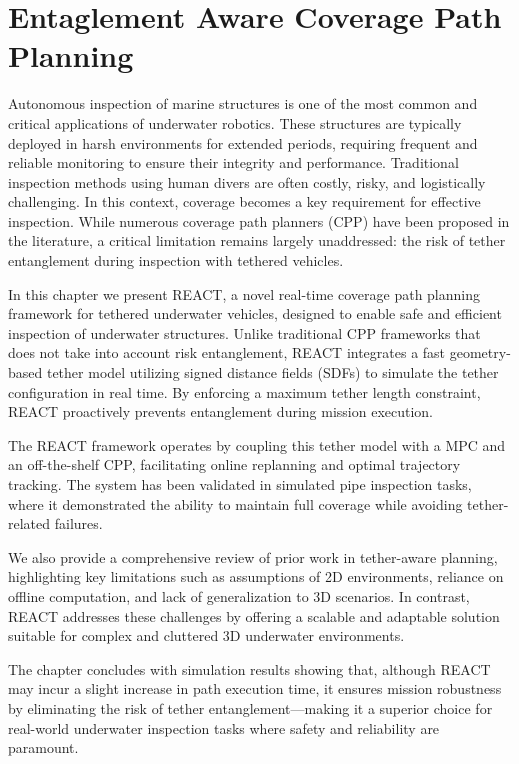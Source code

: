 \chapter{Entaglement Aware Coverage Path Planning}

Autonomous inspection of marine structures is one of the most common and critical applications of underwater robotics. These structures are typically deployed in harsh environments for extended periods, requiring frequent and reliable monitoring to ensure their integrity and performance. Traditional inspection methods using human divers are often costly, risky, and logistically challenging. In this context, coverage becomes a key requirement for effective inspection. While numerous coverage path planners (CPP) have been proposed in the literature, a critical limitation remains largely unaddressed: the risk of tether entanglement during inspection with tethered vehicles.
 
 In this chapter we present REACT, a novel real-time coverage path planning framework for tethered underwater vehicles, designed to enable safe and efficient inspection of underwater structures. Unlike traditional CPP frameworks that does not take into account risk entanglement, REACT integrates a fast geometry-based tether model utilizing signed distance fields (SDFs) to simulate the tether configuration in real time. By enforcing a maximum tether length constraint, REACT proactively prevents entanglement during mission execution.

The REACT framework operates by coupling this tether model with a MPC and an off-the-shelf CPP, facilitating online replanning and optimal trajectory tracking. The system has been validated in simulated pipe inspection tasks, where it demonstrated the ability to maintain full coverage while avoiding tether-related failures.

We also provide a comprehensive review of prior work in tether-aware planning, highlighting key limitations such as assumptions of 2D environments, reliance on offline computation, and lack of generalization to 3D scenarios. In contrast, REACT addresses these challenges by offering a scalable and adaptable solution suitable for complex and cluttered 3D underwater environments.

The chapter concludes with simulation results showing that, although REACT may incur a slight increase in path execution time, it ensures mission robustness by eliminating the risk of tether entanglement—making it a superior choice for real-world underwater inspection tasks where safety and reliability are paramount. 